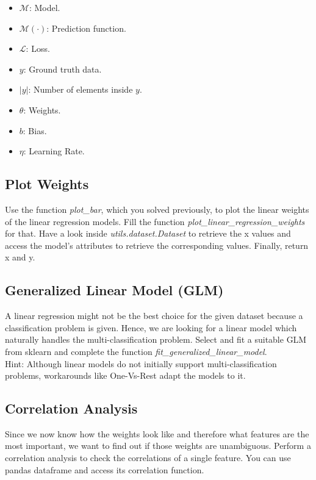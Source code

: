\documentclass[a4paper]{article}
\begin{document}
\begin{itemize}
    \item $\mathcal{M}$: Model.
    \item $\mathcal{M}(\cdot)$: Prediction function.
    \item $\mathcal{L}$: Loss.
    \item $y$: Ground truth data.
    \item $|y|$: Number of elements inside $y$.
    \item $\theta$: Weights.
    \item $b$: Bias.
    \item $\eta$: Learning Rate.
\end{itemize}


\subsection{Plot Weights}
Use the function \textit{plot\_bar}, which you solved previously, to plot the linear weights of the linear regression models. Fill the function \textit{plot\_linear\_regression\_weights} for that. Have a look inside \textit{utils.dataset.Dataset} to retrieve the x values and access the model's attributes to retrieve the corresponding values. Finally, return x and y.

\subsection{Generalized Linear Model (GLM)}
A linear regression might not be the best choice for the given dataset because a classification problem is given. Hence, we are looking for a linear model which naturally handles the multi-classification problem. Select and fit a suitable GLM from sklearn and complete the function \textit{fit\_generalized\_linear\_model}.\\

\noindent Hint: Although linear models do not initially support multi-classification problems, workarounds like One-Vs-Rest adapt the models to it.


\subsection{Correlation Analysis}
Since we now know how the weights look like and therefore what features are the most important, we want to find out if those weights are unambiguous. Perform a correlation analysis to check the correlations of a single feature. You can use pandas dataframe and access its correlation function.\\
\end{document}

